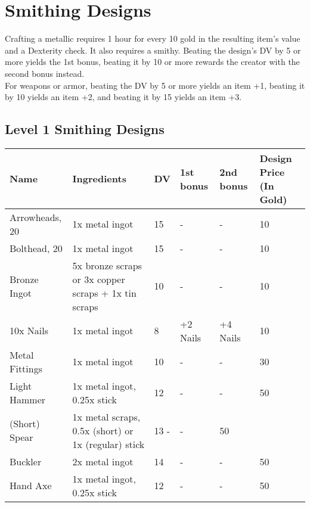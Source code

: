 \section{Smithing Designs}\label{sec:smithingDesigns}
Crafting a metallic requires 1 hour for every 10 gold in the resulting item's value and a Dexterity check.
It also requires a smithy.
Beating the design's DV by 5 or more yields the 1st bonus, beating it by 10 or more rewards the creator with the second bonus instead.\\
For weapons or armor, beating the DV by 5 or more yields an item +1, beating it by 10 yields an item +2, and beating it by 15 yields an item +3.\\

\subsection{Level 1 Smithing Designs}
\begin{longtable}{p{1.5cm} | p{2.5cm} | l | p{2cm} | p{2cm} | p{1cm} }
	Name & Ingredients & DV & 1st bonus & 2nd bonus & Design Price (In Gold)\\ \hline
	Arrowheads, 20 & 1x metal ingot & 15 & - & - & 10\\
	Bolthead, 20 & 1x metal ingot & 15 & - & - & 10\\
	Bronze Ingot & 5x bronze scraps or 3x copper scraps + 1x tin scraps & 10 & - & - & 10\\
	10x Nails & 1x metal ingot & 8 & +2 Nails & +4 Nails & 10\\
	Metal Fittings & 1x metal ingot & 10 & - & - & 30\\
	Light Hammer & 1x metal ingot, 0.25x stick & 12 & - & - & 50\\
	(Short) Spear & 1x metal scraps, 0.5x (short) or 1x (regular) stick & 13 - & - & 50\\
	Buckler & 2x metal ingot & 14 & - & - & 50\\
	Hand Axe & 1x metal ingot, 0.25x stick & 12 & - & - & 50\\
\end{longtable}
%
%
%
%
